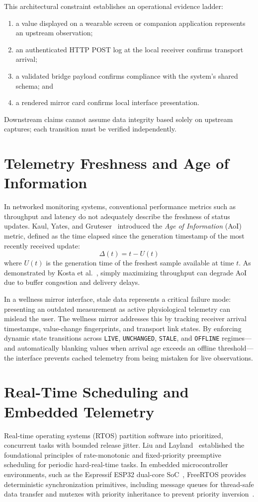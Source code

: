 This architectural constraint establishes an operational evidence ladder:
\begin{enumerate}[noitemsep,topsep=2pt]
  \item a value displayed on a wearable screen or companion application represents an upstream observation;
  \item an authenticated HTTP POST log at the local receiver confirms transport arrival;
  \item a validated bridge payload confirms compliance with the system's shared schema; and
  \item a rendered mirror card confirms local interface presentation.
\end{enumerate}
Downstream claims cannot assume data integrity based solely on upstream captures; each transition must be verified independently.

\section{Telemetry Freshness and Age of Information}
In networked monitoring systems, conventional performance metrics such as throughput and latency do not adequately describe the freshness of status updates. Kaul, Yates, and Gruteser~\cite{kaul2012realtime} introduced the \textit{Age of Information} (AoI) metric, defined as the time elapsed since the generation timestamp of the most recently received update:
\begin{equation}
\Delta(t) = t - U(t)
\end{equation}
where $U(t)$ is the generation time of the freshest sample available at time $t$. As demonstrated by Kosta et al.~\cite{kosta2017age}, simply maximizing throughput can degrade AoI due to buffer congestion and delivery delays.

In a wellness mirror interface, stale data represents a critical failure mode: presenting an outdated measurement as active physiological telemetry can mislead the user. The wellness mirror addresses this by tracking receiver arrival timestamps, value-change fingerprints, and transport link states. By enforcing dynamic state transitions across \texttt{LIVE}, \texttt{UNCHANGED}, \texttt{STALE}, and \texttt{OFFLINE} regimes---and automatically blanking values when arrival age exceeds an offline threshold---the interface prevents cached telemetry from being mistaken for live observations.

\section{Real-Time Scheduling and Embedded Telemetry}
Real-time operating systems (RTOS) partition software into prioritized, concurrent tasks with bounded release jitter. Liu and Layland~\cite{liu1973scheduling} established the foundational principles of rate-monotonic and fixed-priority preemptive scheduling for periodic hard-real-time tasks. In embedded microcontroller environments, such as the Espressif ESP32 dual-core SoC~\cite{espDevKit,espHardware}, FreeRTOS provides deterministic synchronization primitives, including message queues for thread-safe data transfer and mutexes with priority inheritance to prevent priority inversion~\cite{freertosQueues,freertosMutex}.

